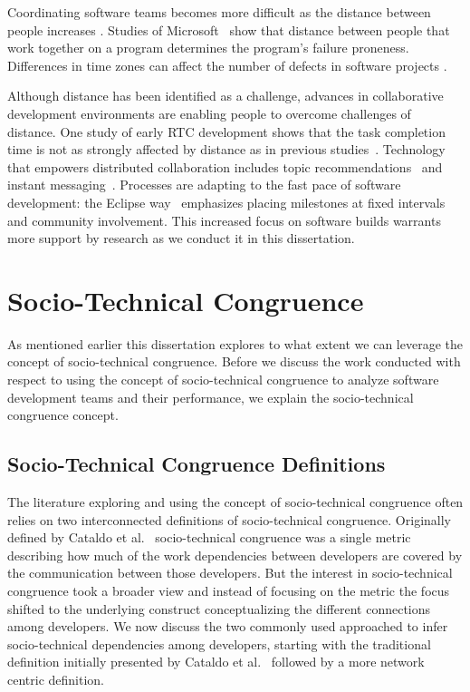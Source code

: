 Coordinating software teams becomes more difficult as the distance between people increases \cite{herbsleb:icse:2001}.
Studies of Microsoft~\cite{bird2009:dds_quality,nagappan:icse:2008}
show that distance between people that work together on a
program determines the program's failure proneness.
Differences in time zones can affect the number of defects in software projects \cite{cataldo2009:quality}.

Although distance has been identified as a challenge, advances in collaborative
development environments are enabling people to overcome challenges of distance.
One study of early RTC development
shows that the task completion time is not as strongly affected by distance as in previous studies~\cite{Nguyen:2008Distance}. Technology that empowers distributed collaboration includes topic recommendations~\cite{carter2004} and instant messaging~\cite{niinimaki2008}. Processes are adapting to the fast pace of software development: the Eclipse way~\cite{frost:ieeesoftware:2007} emphasizes placing milestones at fixed intervals and community involvement.
This increased focus on software builds  warrants more support by research as we conduct it in this dissertation.




\section{Socio-Technical Congruence}
As mentioned earlier this dissertation explores to what extent we can leverage the concept of socio-technical congruence. 
Before we discuss the work conducted with respect to using the concept of socio-technical congruence to analyze software development teams and their performance, we explain the socio-technical congruence concept.

\subsection{Socio-Technical Congruence Definitions}
The literature exploring and using the concept of socio-technical congruence often relies on two interconnected definitions of socio-technical congruence.
Originally defined by Cataldo et al.~\cite{cataldo:cscw:2006} socio-technical congruence was a single metric describing how much of the work dependencies between developers are covered by the communication between those developers.
But the interest in socio-technical congruence took a broader view and instead of focusing on the metric the focus shifted to the underlying construct conceptualizing the different connections among developers.
We now discuss the two commonly used approached to infer socio-technical dependencies among developers, starting with the traditional definition initially presented by Cataldo et al.~\cite{cataldo:cscw:2006} followed by a more network centric definition.

